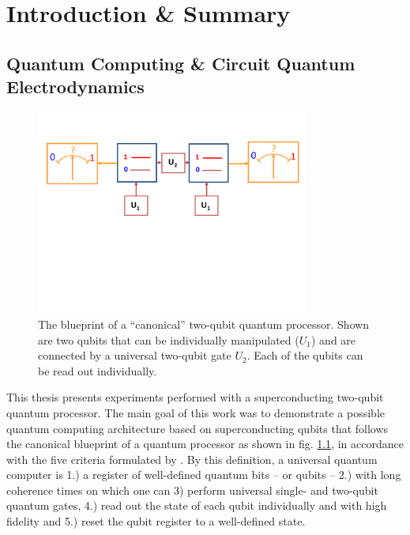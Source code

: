 \chapter{Introduction \& Summary}


\section{Quantum Computing \& Circuit Quantum Electrodynamics}

\begin{figure}
	\centering
		\includegraphics[width=0.8\textwidth]{./material/papers/grover/submission1/Fig1}
	\caption[Blueprint of a ``canonical'' two-qubit quantum processor]{The blueprint of a ``canonical'' two-qubit quantum processor. Shown are two qubits that can be individually manipulated ($U_1$) and are connected by a universal two-qubit gate $U_2$. Each of the qubits can be read out individually.}
	\label{fig:qubit_processor_blueprint}
\end{figure}

This thesis presents experiments performed with a superconducting two-qubit quantum processor. The main goal of this work was to demonstrate a possible quantum computing architecture based on superconducting qubits that follows the canonical blueprint of a quantum processor as shown in fig. \ref{fig:qubit_processor_blueprint}, in accordance with the five criteria formulated by \cite{divincenzo_physical_2000}. By this definition, a universal quantum computer is 1.) a register of well-defined quantum bits -- or qubits -- 2.) with long coherence times on which one can 3) perform universal single- and two-qubit quantum gates, 4.) read out the state of each qubit individually and with high fidelity and 5.) reset the qubit register to a well-defined state.

